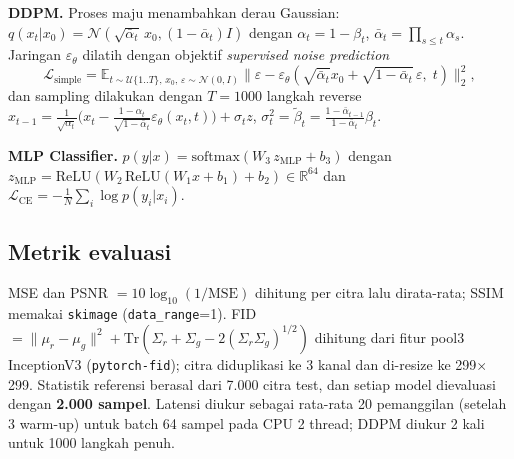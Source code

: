 \textbf{DDPM.} Proses maju menambahkan derau Gaussian:
$q(x_t|x_0)=\mathcal{N}(\sqrt{\bar\alpha_t}\,x_0,(1-\bar\alpha_t)I)$ dengan $\alpha_t=1-\beta_t$, $\bar\alpha_t=\prod_{s\le t}\alpha_s$.
Jaringan $\varepsilon_\theta$ dilatih dengan objektif \emph{supervised noise prediction}
\begin{equation}
\mathcal{L}_{\text{simple}}=\mathbb{E}_{t\sim\mathcal{U}\{1..T\},\,x_0,\,\varepsilon\sim\mathcal{N}(0,I)}
\big\lVert\varepsilon-\varepsilon_\theta(\sqrt{\bar\alpha_t}x_0+\sqrt{1-\bar\alpha_t}\,\varepsilon,\;t)\big\rVert_2^2 ,
\end{equation}
dan sampling dilakukan dengan $T=1000$ langkah reverse
$x_{t-1}=\frac{1}{\sqrt{\alpha_t}}\big(x_t-\frac{1-\alpha_t}{\sqrt{1-\bar\alpha_t}}\varepsilon_\theta(x_t,t)\big)+\sigma_t z$,
$\sigma_t^2=\tilde\beta_t=\frac{1-\bar\alpha_{t-1}}{1-\bar\alpha_t}\beta_t$.

\textbf{MLP Classifier.} $p(y|x)=\mathrm{softmax}(W_3\,z_{\text{MLP}}+b_3)$ dengan
$z_{\text{MLP}}=\mathrm{ReLU}(W_2\,\mathrm{ReLU}(W_1x+b_1)+b_2)\in\mathbb{R}^{64}$ dan
$\mathcal{L}_{\text{CE}}=-\frac1N\sum_i\log p(y_i|x_i)$.

\subsection{Metrik evaluasi}
MSE dan PSNR $=10\log_{10}(1/\text{MSE})$ dihitung per citra lalu dirata-rata; SSIM memakai
\texttt{skimage} (\texttt{data\_range}=1). FID $=\lVert\mu_r-\mu_g\rVert^2+\mathrm{Tr}(\Sigma_r+\Sigma_g-2(\Sigma_r\Sigma_g)^{1/2})$
dihitung dari fitur pool3 InceptionV3 (\texttt{pytorch-fid}); citra diduplikasi ke 3 kanal dan di-resize ke 299$\times$299.
Statistik referensi berasal dari 7.000 citra test, dan setiap model dievaluasi dengan \textbf{2.000 sampel}.
Latensi diukur sebagai rata-rata 20 pemanggilan (setelah 3 warm-up) untuk batch 64 sampel pada CPU 2 thread;
DDPM diukur 2 kali untuk 1000 langkah penuh.
